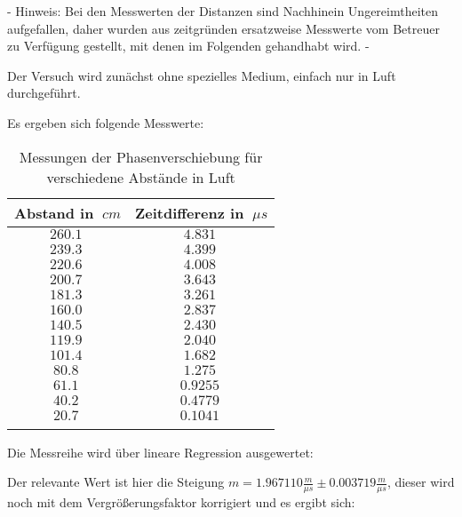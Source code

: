 - Hinweis: Bei den Messwerten der Distanzen sind Nachhinein Ungereimtheiten aufgefallen, daher wurden aus zeitgründen ersatzweise Messwerte vom Betreuer zu Verfügung gestellt, mit denen im Folgenden gehandhabt wird. -

Der Versuch wird zunächst ohne spezielles Medium, einfach nur in Luft durchgeführt.

Es ergeben sich folgende Messwerte:

\begin{table}[h!]
    \begin{center}
        \caption{Messungen der Phasenverschiebung für verschiedene Abstände in Luft}
        \begin{tabular}{cc}
            \hline
            Abstand in $\SI{}{cm}$ & Zeitdifferenz in $\SI{}{\mu s}$ \\
            \hline
            $\SI{260,1}{}$    & $\SI{4,831}{}$ \\
            $\SI{239,3}{}$    & $\SI{4,399}{}$ \\
            $\SI{220,6}{}$    & $\SI{4,008}{}$ \\
            $\SI{200,7}{}$    & $\SI{3,643}{}$ \\
            $\SI{181,3}{}$    & $\SI{3,261}{}$ \\
            $\SI{160,0}{}$    & $\SI{2,837}{}$ \\
            $\SI{140,5}{}$    & $\SI{2,430}{}$ \\
            $\SI{119,9}{}$    & $\SI{2,040}{}$ \\
            $\SI{101,4}{}$    & $\SI{1,682}{}$ \\
            $\SI{80,8}{}$     & $\SI{1,275}{}$ \\
            $\SI{61,1}{}$     & $\SI{0,9255}{}$ \\
            $\SI{40,2}{}$     & $\SI{0,4779}{}$ \\
            $\SI{20,7}{}$     & $\SI{0,1041}{}$ \\
            \hline
            \label{tab:Messwerte-Zeitdiffernz-Abstand}
        \end{tabular}
    \end{center}
\end{table}

Die Messreihe wird über lineare Regression ausgewertet:



Der relevante Wert ist hier die Steigung $m = 1.967110{\frac{m}{\mu s}} \pm 0.003719{\frac{m}{\mu s}}$, dieser wird noch mit dem Vergrößerungsfaktor korrigiert und es ergibt sich:


